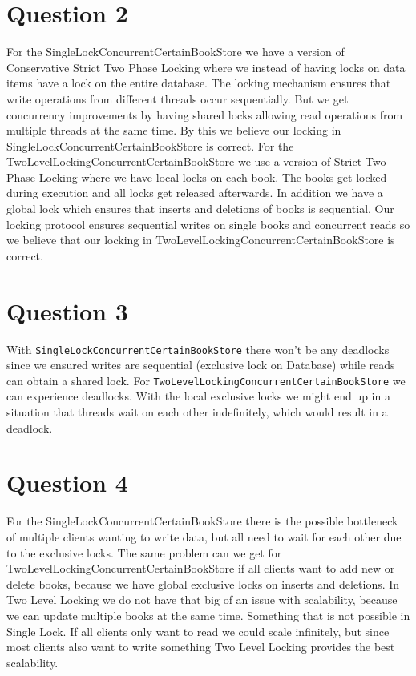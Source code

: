 \documentclass[12pt,a4paper]{article}
\begin{document}
\section{Question 2}
For the SingleLockConcurrentCertainBookStore we have a version of Conservative Strict Two Phase Locking where we instead of having locks on data items have a lock on the entire database. The locking mechanism ensures that write operations from different threads occur sequentially. But we get concurrency improvements by having shared locks allowing read operations from multiple threads at the same time. By this we believe our locking in SingleLockConcurrentCertainBookStore is correct.
For the TwoLevelLockingConcurrentCertainBookStore we use a version of Strict Two Phase Locking where we have local locks on each book. The books get locked during execution and all locks get released afterwards. In addition we have a global lock which ensures that inserts and deletions of books is sequential. Our locking protocol ensures sequential writes on single books and concurrent reads so we believe that our locking in TwoLevelLockingConcurrentCertainBookStore is correct.

\section{Question 3}
With \texttt{SingleLockConcurrentCertainBookStore} there won't be any deadlocks since we ensured writes are sequential (exclusive lock on Database) while reads can obtain a shared lock.
For \texttt{TwoLevelLockingConcurrentCertainBookStore} we can experience deadlocks.
With the local exclusive locks we might end up in a situation that threads wait on each other indefinitely, which would result in a deadlock.


\section{Question 4}
For the SingleLockConcurrentCertainBookStore there is the possible bottleneck of multiple clients wanting to write data, but all need to wait for each other due to the exclusive locks. The same problem can we get for TwoLevelLockingConcurrentCertainBookStore if all clients want to add new or delete books, because we have global exclusive locks on inserts and deletions. In Two Level Locking we do not have that big of an issue with scalability, because we can update multiple books at the same time. Something that is not possible in Single Lock.
If all clients only want to read we could scale infinitely, but since most clients also want to write something Two Level Locking provides the best scalability. 
\end{document}
